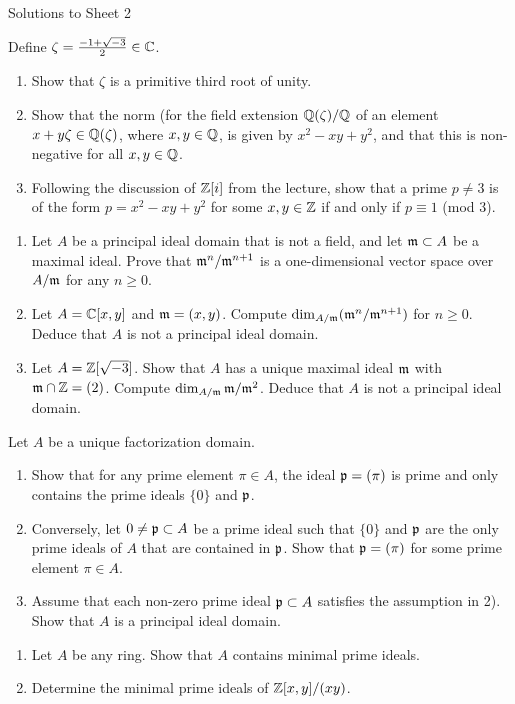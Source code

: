 \documentclass[a4paper,11pt]{article}
\begin{document}
\begin{center}
    \huge{Solutions to Sheet 2}
\end{center}

Define $\zeta = \frac{-1 + \sqrt{-3}}2 \in \mathbb{C}$. 
\begin{enumerate}
    \item Show that $\zeta$ is a primitive third root of unity.
    \item Show that the norm (for the field extension $\mathbb{Q}(\zeta)/\mathbb{Q}$ of
        an element $x + y\zeta \in \mathbb{Q}(\zeta)$, where $x,y \in \mathbb{Q}$, is given by
        $x^2 - xy + y^2$, and that this is non-negative for all $x,y \in \mathbb{Q}$. 
    \item  Following the discussion of $\mathbb{Z}[i]$ from the lecture, show that a prime
        $p \neq 3$ is of the form $p = x^2 - xy + y^2$ for some $x,y \in \mathbb{Z}$ if
        and only if $p \equiv 1$ (mod $3$). 
\end{enumerate}

\begin{enumerate}
    \item Let $A$ be a principal ideal domain that is not a field, and let $\mathfrak{m}
        \subset A$ be a maximal ideal. Prove that $\mathfrak{m}^n/\mathfrak{m}^{n+1}$ is a
        one-dimensional vector space over $A/\mathfrak{m}$ for any $n \geq 0$. 
    \item Let $A = \mathbb{C}[x,y]$ and $\mathfrak{m} = (x,y)$. Compute $\dim_{A/\mathfrak{m}} (\mathfrak{m}^n
        /\mathfrak{m}^{n+1})$ for $n \geq 0$. Deduce that $A$ is not a principal ideal
        domain. 
    \item Let $A = \mathbb{Z}[\sqrt{-3}]$. Show that $A$ has a unique maximal ideal $\mathfrak{m}$
        with $\mathfrak{m} \cap \mathbb{Z} = (2)$. Compute $\dim_{A/\mathfrak{m}} \mathfrak{m}/\mathfrak{m}^2$. Deduce that 
        $A$ is not a principal ideal domain.
\end{enumerate}

Let $A$ be a unique factorization domain. 
\begin{enumerate}
    \item Show that for any prime element $\pi \in A$, the ideal $\mathfrak{p} = (\pi)$ is 
        prime and only contains the prime ideals $\{0\}$ and $\mathfrak{p}$.
    \item Conversely, let $0 \neq \mathfrak{p} \subset A$ be a prime ideal such that $\{0\}$
        and $\mathfrak{p}$ are the only prime ideals of $A$ that are contained in $\mathfrak{p}$. 
        Show that $\mathfrak{p} = (\pi)$ for some prime element $\pi \in A$. 
    \item Assume that each non-zero prime ideal $\mathfrak{p} \subset A$ satisfies the
        assumption in 2). Show that $A$ is a principal ideal domain. 
\end{enumerate}

\begin{enumerate}
    \item Let $A$ be any ring. Show that $A$ contains minimal prime ideals. 
    \item Determine the minimal prime ideals of $\mathbb{Z}[x,y]/(xy)$. 
\end{enumerate}
\contactend
\end{document}
